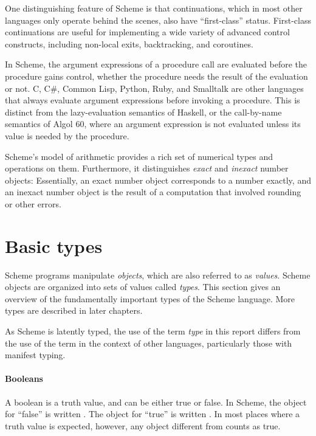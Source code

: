 \vest One distinguishing feature of Scheme is that continuations, which
in most other languages only operate behind the scenes, also have
``first-class'' status.  First-class continuations are useful for implementing a
wide variety of advanced control constructs, including non-local exits,
backtracking, and coroutines.

In Scheme, the argument expressions of a procedure call are evaluated
before the procedure gains control, whether the procedure needs the
result of the evaluation or not.  C, C\#, Common Lisp, Python,
Ruby, and Smalltalk are other languages that always evaluate argument
expressions before invoking a procedure.  This is distinct from the
lazy-evaluation semantics of Haskell, or the call-by-name semantics of
Algol 60, where an argument expression is not evaluated unless its
value is needed by the procedure.

Scheme's model of arithmetic provides a rich set of numerical types
and operations on them.  Furthermore, it distinguishes \textit{exact}
and \textit{inexact} number objects: Essentially, an exact number
object corresponds to a number exactly, and an inexact number object
is the result of a computation that involved rounding or other errors.

\section{Basic types}

Scheme programs manipulate \textit{objects}, which are also referred
to as \textit{values}.
Scheme objects are organized into sets of values called \textit{types}.
This section gives an overview of the fundamentally important types of the
Scheme language.  More types are described in later chapters.

\begin{note}
  As Scheme is latently typed, the use of the term \textit{type} in
  this report differs from the use of the term in the context of other
  languages, particularly those with manifest typing.
\end{note}

\paragraph{Booleans}

A boolean is a truth value, and can be either
true or false.  In Scheme, the object for ``false'' is written
\schfalse{}.  The object for ``true'' is written \schtrue{}.  In
most places where a truth value is expected, however, any object different from
\schfalse{} counts as true.

